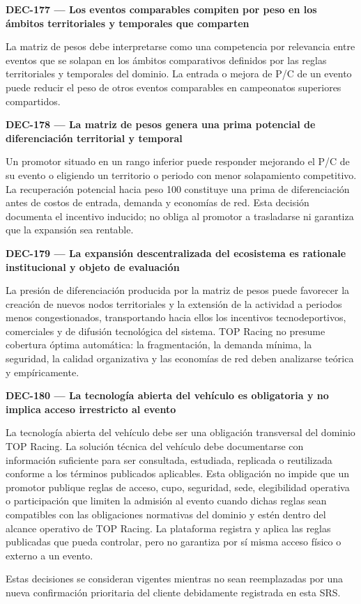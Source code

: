 \documentclass[10pt,letterpaper]{article}
\begin{document}
\noindent\textbf{DEC-177 --- Los eventos comparables compiten por peso en los ámbitos territoriales y temporales que comparten}\par
La matriz de pesos debe interpretarse como una competencia por relevancia entre eventos que se solapan en los ámbitos comparativos definidos por las reglas territoriales y temporales del dominio. La entrada o mejora de P/C de un evento puede reducir el peso de otros eventos comparables en campeonatos superiores compartidos.\par\vspace{0.45em}
\noindent\textbf{DEC-178 --- La matriz de pesos genera una prima potencial de diferenciación territorial y temporal}\par
Un promotor situado en un rango inferior puede responder mejorando el P/C de su evento o eligiendo un territorio o periodo con menor solapamiento competitivo. La recuperación potencial hacia peso 100 constituye una prima de diferenciación antes de costos de entrada, demanda y economías de red. Esta decisión documenta el incentivo inducido; no obliga al promotor a trasladarse ni garantiza que la expansión sea rentable.\par\vspace{0.45em}
\noindent\textbf{DEC-179 --- La expansión descentralizada del ecosistema es rationale institucional y objeto de evaluación}\par
La presión de diferenciación producida por la matriz de pesos puede favorecer la creación de nuevos nodos territoriales y la extensión de la actividad a periodos menos congestionados, transportando hacia ellos los incentivos tecnodeportivos, comerciales y de difusión tecnológica del sistema. TOP Racing no presume cobertura óptima automática: la fragmentación, la demanda mínima, la seguridad, la calidad organizativa y las economías de red deben analizarse teórica y empíricamente.\par\vspace{0.45em}
\noindent\textbf{DEC-180 --- La tecnología abierta del vehículo es obligatoria y no implica acceso irrestricto al evento}\par
La tecnología abierta del vehículo debe ser una obligación transversal del dominio TOP Racing. La solución técnica del vehículo debe documentarse con información suficiente para ser consultada, estudiada, replicada o reutilizada conforme a los términos publicados aplicables. Esta obligación no impide que un promotor publique reglas de acceso, cupo, seguridad, sede, elegibilidad operativa o participación que limiten la admisión al evento cuando dichas reglas sean compatibles con las obligaciones normativas del dominio y estén dentro del alcance operativo de TOP Racing. La plataforma registra y aplica las reglas publicadas que pueda controlar, pero no garantiza por sí misma acceso físico o externo a un evento.\par\vspace{0.45em}
Estas decisiones se consideran vigentes mientras no sean reemplazadas por una nueva confirmación prioritaria del cliente debidamente registrada en esta SRS.\par \label{sec:01_05_vision_general}\par\vspace{0.45em}
\end{document}

